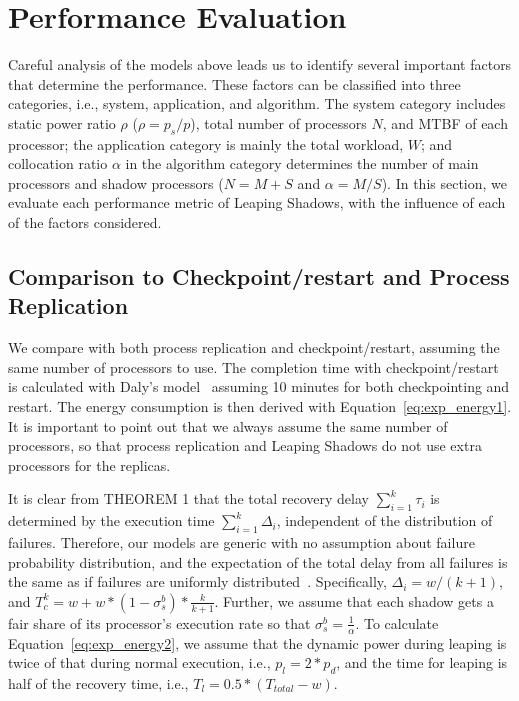 \section{Performance Evaluation}
Careful analysis of the models above leads us to identify several important factors that determine the performance. These factors can be classified into three categories, i.e., system, application, and algorithm. The system category includes static power ratio $\rho$ ($\rho=p_s/p$), total number of processors $N$, and MTBF of each processor; the application category is mainly the total workload, $W$; and collocation ratio $\alpha$ in the algorithm category determines the number of main processors and shadow processors ($N=M+S$ and $\alpha=M/S$). In this section, we evaluate each performance metric of Leaping Shadows,  with the influence of each of the factors considered. %


\subsection{Comparison to Checkpoint/restart and Process Replication}
\label{eval_comparison}
We compare with both process replication and checkpoint/restart, assuming the same number of processors to use. 
The completion time with checkpoint/restart is calculated with Daly's model~\cite{daly_fgcs_2006} assuming 10 minutes for both checkpointing and restart. The energy consumption is then derived with Equation~\ref{eq:exp_energy1}. It is important to point out that we always assume the same number of processors, so that process replication and Leaping Shadows do not use extra processors for the replicas. 

It is clear from THEOREM 1 that the total recovery delay $\sum_{i=1}^k\tau_i$ is determined by the execution time $\sum_{i=1}^k\Delta_i$, independent of the distribution of failures. 
Therefore, our models are generic with no assumption about failure probability distribution, and the expectation of the total delay from all failures is the same as if failures are uniformly distributed~\cite{daly_fgcs_2006}. Specifically, $\Delta_i = w/(k+1)$, and $T_c^k = w + w*(1-\sigma_s^b)*\frac{k}{k+1}$. Further, we assume that each shadow gets a fair share of its processor's execution rate so that $\sigma_s^b = \frac{1}{\alpha}$. 
To calculate Equation~\ref{eq:exp_energy2}, we assume that the dynamic power during leaping is twice of that during normal execution, i.e., $p_{l}=2*p_d$, and the time for leaping is half of the recovery time, i.e., $T_l=0.5*(T_{total} - w)$. 

